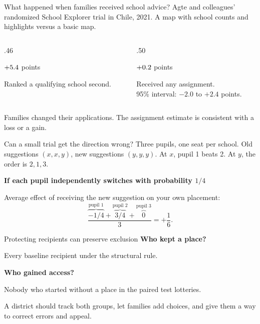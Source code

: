 \documentclass[aspectratio=169,14pt]{beamer}
\begin{document}
\begin{frame}{What happened when families received school advice?}
{\small Agte and colleagues' randomized School Explorer trial in Chile, 2021. A map with school counts and highlights versus a basic map.}
\bigskip
\begin{columns}[T,onlytextwidth]
\begin{column}{.46\textwidth}
{\LARGE $+5.4$ points\par}
Ranked a qualifying school second.
\end{column}
\begin{column}{.50\textwidth}
{\LARGE $+0.2$ points\par}
Received any assignment.\\[2pt]
{\small 95\% interval: $-2.0$ to $+2.4$ points.}
\end{column}
\end{columns}
\bigskip
Families changed their applications. The assignment estimate is consistent with a loss or a gain.
\end{frame}

\begin{frame}{Can a small trial get the direction wrong?}
{\small Three pupils, one seat per school. Old suggestions $(x,x,y)$, new suggestions $(y,y,y)$. At $x$, pupil 1 beats 2. At $y$, the order is $2,1,3$.}
\medskip

\textbf{If each pupil independently switches with probability $1/4$}\par
Average effect of receiving the new suggestion on your own placement:
\[
\frac{\overbrace{-1/4}^{\text{pupil 1}}+\overbrace{3/4}^{\text{pupil 2}}+\overbrace{0}^{\text{pupil 3}}}{3} = +\frac{1}{6}.
\]
\end{frame}

\begin{frame}{Protecting recipients can preserve exclusion}
\textbf{Who kept a place?}\par
Every baseline recipient under the structural rule.\par\medskip
\textbf{Who gained access?}\par
Nobody who started without a place in the paired test lotteries.\par\medskip
A district should track both groups, let families add choices, and give them a way to correct errors and appeal.
\end{frame}
\end{document}
